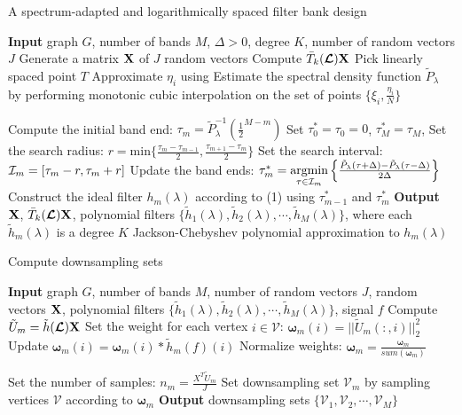 \documentclass[a4paper]{article}
\newcommand{\V}{\mathcal{V}}
\renewcommand{\L}{\boldsymbol{\mathcal{L}}}
\theoremstyle{definition}
\begin{document}
\begin{algorithm}[h!]
\caption{A spectrum-adapted and logarithmically spaced filter bank design}
\begin{algorithmic}
\State \textbf{Input} graph $G$, number of bands $M$, $\Delta>0$, degree $K$, number of random vectors $J$
\State Generate a matrix $\bf{X}$ of $J$ random vectors
\State Compute $\bar{T}_k(\L)\bf{X}$ %
\State Pick linearly spaced point $T$
\State Approximate $\eta_{i}$ using %
\EndFor
\State Estimate the spectral density function $\tilde{P}_{\lambda}$ by performing monotonic cubic interpolation on the set of points $\{\xi_i, \frac{\eta_i}{N} \}$ 

\State Compute the initial band end: $\tau_m = \tilde{P}_{\lambda}^{-1}(\frac{1}{2}^{M-m})$
\EndFor
\State Set $\tau_0^* = \tau_0 = 0$, $\tau_M^* = \tau_M$, 
\State Set the search radius: $r = \text{min} \{\frac{\tau_m-\tau_{m-1}}{2}, \frac{\tau_{m+1}-\tau_m}{2}\}$
\State Set the search interval: ${\cal I}_m = [\tau_m-r, \tau_m+r]$
\State Update the band ends: $\tau_m^* = \underset{\tau \in {\cal I}_m}{\text{argmin}} \left\{\frac{\tilde{P}_{\lambda}(\tau+\Delta)-\tilde{P}_{\lambda}(\tau-\Delta)}{2\Delta}\right\}$
\EndFor
{}
\State Construct the ideal filter $h_m(\lambda)$ according to (1) using $\tau_{m-1}^*$ and $\tau_m^*$%
\EndFor
\State \textbf{Output} $\bf{X}$, $\bar{T}_k(\L)\bf{X}$, 
polynomial filters $\{ \tilde{h}_1(\lambda), \tilde{h}_2(\lambda), \cdots, \tilde{h}_M(\lambda)\}$, where each $\tilde{h}_m(\lambda)$ is a degree $K$ Jackson-Chebyshev polynomial approximation to  $h_m(\lambda)$ %
\end{algorithmic}
\label{Al:uniqueness}
\end{algorithm}

\begin{algorithm}[h!]
\caption{Compute downsampling sets}
\begin{algorithmic}
\State \textbf{Input} graph $G$, number of bands $M$, number of random vectors $J$, random vectors $\bf{X}$, polynomial filters $\{ \tilde{h}_1(\lambda), \tilde{h}_2(\lambda), \cdots, \tilde{h}_M(\lambda)\}$, signal $f$
\State Compute $\tilde{U}_m = \tilde{h}(\L)\bf{X}$
\State Set the weight for each vertex $i \in \V$: ${\boldsymbol \omega}_m(i) = ||\tilde{U}_m(:,i)||^2_2$
\State Update ${\boldsymbol \omega}_m(i) = {\boldsymbol \omega}_m(i) * \tilde{h}_m(f)(i)$
\EndIf
\State Normalize weights: ${\boldsymbol \omega}_m=\frac{{\boldsymbol \omega}_m}{sum({\boldsymbol \omega}_m)}$

\State Set the number of samples: $n_m = \frac{X^T \tilde{U}_m}{J}$ 
\State Set downsampling set $\V_m$ by sampling vertices $\V$ according to ${\boldsymbol \omega}_m$
\EndFor
\State \textbf{Output} downsampling sets $\{\V_1,\V_2, \cdots, \V_M\}$
\end{algorithmic}
\end{algorithm}
\end{document}
